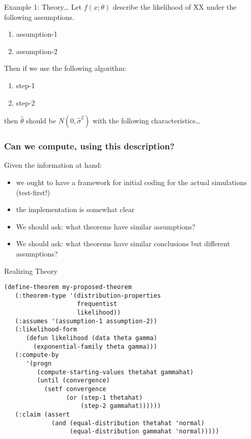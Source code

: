\documentclass{beamer}
\begin{document}
\begin{frame}[fragile]{Example 1: Theory\ldots}
  \label{example1}
  Let $f(x;\theta)$ describe the likelihood of XX under the following
  assumptions.  
  \begin{enumerate}
  \item assumption-1
  \item assumption-2
  \end{enumerate}
  Then if we use the following algorithm:
  \begin{enumerate}
  \item step-1
  \item step-2
  \end{enumerate}
  then $\hat{\theta}$ should be $N(0,\hat\sigma^2)$ with the following
  characteristics\ldots
\end{frame}

\begin{frame}
  \frametitle{Can we compute, using this description?}
  Given the information at hand:
  \begin{itemize}
  \item we ought to have a framework for initial coding for the
    actual simulations (test-first!)
  \item the implementation is somewhat clear
  \item We should ask: what theorems have similar assumptions?
  \item We should ask: what theorems have similar conclusions but
    different assumptions?
  \end{itemize}
\end{frame}

\begin{frame}[fragile]{Realizing Theory}
\small{
\begin{verbatim}  
(define-theorem my-proposed-theorem
   (:theorem-type '(distribution-properties
                    frequentist
                    likelihood))
   (:assumes '(assumption-1 assumption-2))
   (:likelihood-form
      (defun likelihood (data theta gamma)
        (exponential-family theta gamma)))
   (:compute-by
      '(progn
         (compute-starting-values thetahat gammahat)
         (until (convergence)
           (setf convergence
                 (or (step-1 thetahat)
                     (step-2 gammahat))))))
   (:claim (assert 
             (and (equal-distribution thetahat 'normal)
                  (equal-distribution gammahat 'normal)))))
\end{verbatim}
}
\end{frame}
\end{document}
